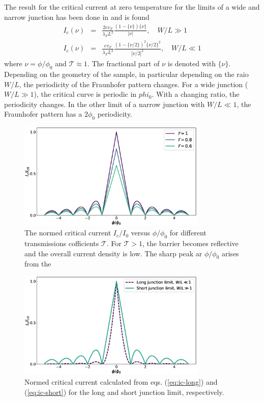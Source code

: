 The result for the critical current at zero temperature for the limits of a wide and narrow junction has been done in\cite{Barzykin1999} and is found
\begin{eqnarray}
I_c(\nu) &=& \frac{2 e v_F }{\lambda_F L^2}\frac{( 1- \{ \nu \}) \{ \nu \} }{|\nu|}, \quad W/L \gg 1 \label{eq:ic-short}\\
I_c(\nu) &=& \frac{e v_F }{\lambda_F L^2}\frac{( 1- \{ \nu/2  \})^2 \{ \nu/2 \}^2 }{|\nu/2|^2}, \quad W/L \ll 1 \label{eq:ic-long}
\end{eqnarray}
where $\nu = \phi / \phi_0 $ and $\mathcal{T} \approx 1$. The fractional part of $\nu$ is denoted with $\{ \nu \}$. Depending on the geometry of the sample, in particular depending on the raio $W/L$, the periodicity of the Fraunhofer pattern changes. For a wide junction ($W/L \gg 1$), the critical curve is periodic in $phi_0$. With a changing ratio, the periodicity changes. In the other limit of a narrow junction with  $W/L \ll 1$, the Fraunhofer pattern has a $2\phi_0$ periodicity.
\begin{figure}
\centering
\includegraphics[width=0.8\textwidth]{figure/analyticalmodel/ic_vs_tau}
\caption{The normed critical current $I_c/I_0$ versus $\phi / \phi_0$ for different transmissions cofficients $\mathcal{T}$. For $\mathcal{T} > 1$, the barrier becomes reflective and the overall current density is low. The sharp peak ar $\phi / \phi_0$ arises from the  }
\end{figure}
\begin{figure}
\centering
\includegraphics[width=0.8\textwidth]{figure/analyticalmodel/ic-long-vs-short}
\caption{Normed critical current calculated from eqs. (\ref{eq:ic-long}) and (\ref{eq:ic-short}) for the long and short junction limit, respectively. }
\end{figure}

